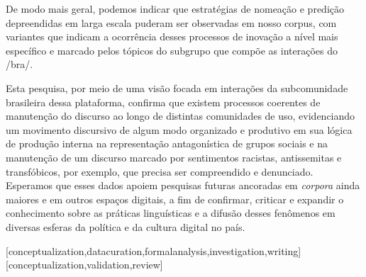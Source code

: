 \documentclass[portuguese]{textolivre}
\begin{document}
De modo mais geral, podemos indicar que estratégias de nomeação e predição depreendidas em larga escala puderam ser observadas em nosso corpus, com variantes que indicam a ocorrência desses processos de inovação a nível mais específico e marcado pelos tópicos do subgrupo que compõe as interações do /bra/.

Esta pesquisa, por meio de uma visão focada em interações da subcomunidade brasileira dessa plataforma, confirma que existem processos coerentes de manutenção do discurso ao longo de distintas comunidades de uso, evidenciando um movimento discursivo de algum modo organizado e produtivo em sua lógica de produção interna na representação antagonística de grupos sociais e na manutenção de um discurso marcado por sentimentos racistas, antissemitas e transfóbicos, por exemplo, que precisa ser compreendido e denunciado. Esperamos que esses dados apoiem pesquisas futuras ancoradas em \emph{corpora} ainda maiores e em outros espaços digitais, a fim de confirmar, criticar e expandir o conhecimento sobre as práticas linguísticas e a difusão desses fenômenos em diversas esferas da política e da cultura digital no país.

\printbibliography\label{sec-bib}


\begin{contributors}
[conceptualization,datacuration,formalanalysis,investigation,writing]
[conceptualization,validation,review]
\end{contributors}
\end{document}
